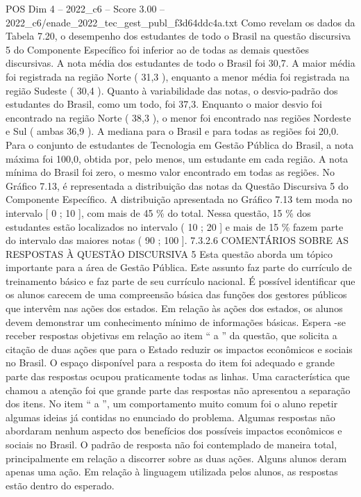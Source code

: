 \begin{textsample}{POS Dim 4 – 2022\_c6 – Score 3.00 – 2022\_c6/enade\_2022\_tec\_gest\_publ\_f3d64ddc4a.txt}
Como revelam os dados da Tabela 7.20, o desempenho dos estudantes de todo o Brasil na questão discursiva 5 do Componente Específico foi inferior ao de todas as demais questões discursivas.
A nota média dos estudantes de todo o Brasil foi 30,7.
A maior média foi registrada na região Norte ( 31,3 ), enquanto a menor média foi registrada na região Sudeste ( 30,4 ).
Quanto à variabilidade das notas, o desvio-padrão dos estudantes do Brasil, como um todo, foi 37,3.
Enquanto o maior desvio foi encontrado na região Norte ( 38,3 ), o menor foi encontrado nas regiões Nordeste e Sul ( ambas 36,9 ).
A mediana para o Brasil e para todas as regiões foi 20,0.
Para o conjunto de estudantes de Tecnologia em Gestão Pública do Brasil, a nota máxima foi 100,0, obtida por, pelo menos, um estudante em cada região.
A nota mínima do Brasil foi zero, o mesmo valor encontrado em todas as regiões.
No Gráfico 7.13, é representada a distribuição das notas da Questão Discursiva 5 do Componente Específico.
A distribuição apresentada no Gráfico 7.13 tem moda no intervalo [ 0 ; 10 ], com mais de 45 \% do total.
Nessa questão, 15 \% dos estudantes estão localizados no intervalo ( 10 ; 20 ] e mais de 15 \% fazem parte do intervalo das maiores notas ( 90 ; 100 ]. 7.3.2.6 COMENTÁRIOS SOBRE AS RESPOSTAS À QUESTÃO DISCURSIVA 5 Esta questão aborda um tópico importante para a área de Gestão Pública.
Este assunto faz parte do currículo de treinamento básico e faz parte de seu currículo nacional.
É possível identificar que os alunos carecem de uma compreensão básica das funções dos gestores públicos que intervêm nas ações dos estados.
Em relação às ações dos estados, os alunos devem demonstrar um conhecimento mínimo de informações básicas.
Espera -se receber respostas objetivas em relação ao item “ a ” da questão, que solicita a citação de duas ações que para o Estado reduzir os impactos econômicos e sociais no Brasil.
O espaço disponível para a resposta do item foi adequado e grande parte das respostas ocupou praticamente todas as linhas.
Uma característica que chamou a atenção foi que grande parte das respostas não apresentou a separação dos itens.
No item “ a ”, um comportamento muito comum foi o aluno repetir algumas ideias já contidas no enunciado do problema.
Algumas respostas não abordaram nenhum aspecto dos benefícios dos possíveis impactos econômicos e sociais no Brasil.
O padrão de resposta não foi contemplado de maneira total, principalmente em relação a discorrer sobre as duas ações.
Alguns alunos deram apenas uma ação.
Em relação à linguagem utilizada pelos alunos, as respostas estão dentro do esperado.

\end{textsample}
